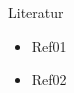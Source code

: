 \documentclass[final,hyperref={pdfpagelabels=false}]{beamer}
\begin{document}
\begin{frame}[t]
\begin{columns}[t]
\begin{column}{.465\textwidth}

\begin{block}{Literatur}

\begin{itemize}

\item Ref01
\item Ref02

\end{itemize}


\end{block}

\end{column}

\begin{column}{.025\textwidth}\end{column} %

\end{columns} %









\nocite{*}

%  

\end{frame} %
\end{document}
